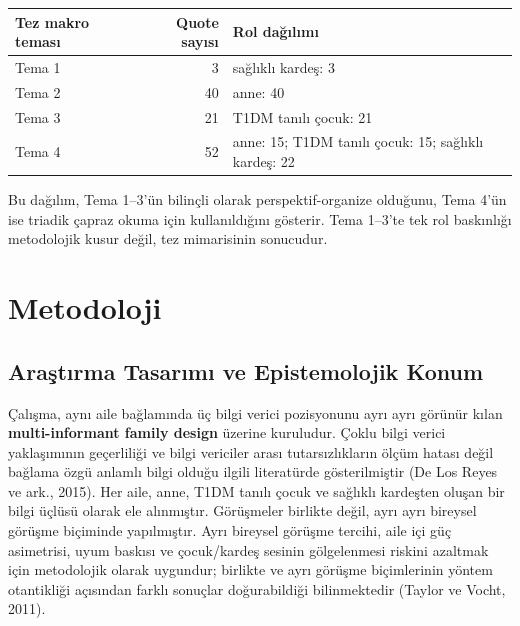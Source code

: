 \documentclass[
  turkish,
  a4paper,
  DIV=11,
  numbers=noendperiod]{scrreprt}
\newcounter{none} %
\begin{document}
{\def\LTcaptype{none} %
\begin{longtable}[]{@{}lrl@{}}
\toprule\noalign{}
Tez makro teması & Quote sayısı & Rol dağılımı \\
\midrule\noalign{}
\endhead
\bottomrule\noalign{}
\endlastfoot
Tema 1 & 3 & sağlıklı kardeş: 3 \\
Tema 2 & 40 & anne: 40 \\
Tema 3 & 21 & T1DM tanılı çocuk: 21 \\
Tema 4 & 52 & anne: 15; T1DM tanılı çocuk: 15; sağlıklı kardeş: 22 \\
\end{longtable}
}

Bu dağılım, Tema 1--3'ün bilinçli olarak perspektif-organize olduğunu,
Tema 4'ün ise triadik çapraz okuma için kullanıldığını gösterir. Tema
1--3'te tek rol baskınlığı metodolojik kusur değil, tez mimarisinin
sonucudur.

\chapter{Metodoloji}\label{sec-metodoloji}

\section{Araştırma Tasarımı ve Epistemolojik
Konum}\label{araux15ftux131rma-tasarux131mux131-ve-epistemolojik-konum}

Çalışma, aynı aile bağlamında üç bilgi verici pozisyonunu ayrı ayrı
görünür kılan \textbf{multi-informant family design} üzerine kuruludur.
Çoklu bilgi verici yaklaşımının geçerliliği ve bilgi vericiler arası
tutarsızlıkların ölçüm hatası değil bağlama özgü anlamlı bilgi olduğu
ilgili literatürde gösterilmiştir (De Los Reyes ve ark., 2015). Her
aile, anne, T1DM tanılı çocuk ve sağlıklı kardeşten oluşan bir bilgi
üçlüsü olarak ele alınmıştır. Görüşmeler birlikte değil, ayrı ayrı
bireysel görüşme biçiminde yapılmıştır. Ayrı bireysel görüşme tercihi,
aile içi güç asimetrisi, uyum baskısı ve çocuk/kardeş sesinin
gölgelenmesi riskini azaltmak için metodolojik olarak uygundur; birlikte
ve ayrı görüşme biçimlerinin yöntem otantikliği açısından farklı
sonuçlar doğurabildiği bilinmektedir (Taylor ve Vocht, 2011).
\end{document}
